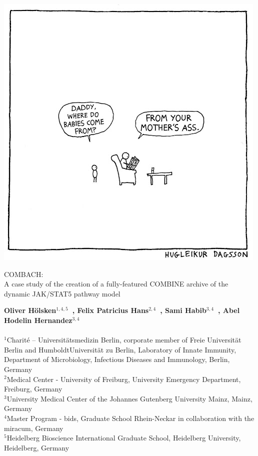 \begin{titlepage}


\begin{centering}
\includegraphics[scale=0.5]{unnamed.jpg}
\vspace{1cm}

{\noindent\huge{COMBACH:\\ A case study of the creation of a fully-featured COMBINE archive of the dynamic JAK/STAT5 pathway model}}

\end{centering}


\vspace{2cm}
\noindent\textbf{Oliver H\"olsken$^{1,4,5}$~, Felix Patricius Hans$^{2,4}$~, Sami Habib$^{3,4}$~, Abel Hodelin Hernandez$^{3,4}$~}
\\ \\
	\small $^{1}$Charité – Universit\"atsmedizin Berlin, corporate member of Freie Universit\"at Berlin and HumboldtUniversit\"at zu Berlin, Laboratory of Innate Immunity, Department of Microbiology, Infectious Diseases and Immunology, Berlin, Germany \\
	\small $^{2}$Medical Center - University of Freiburg, University Emergency Department, Freiburg, Germany \\
	\small $^{3}$University Medical Center of the Johannes Gutenberg University Mainz, Mainz, Germany \\
	\small $^{4}$Master Program - \ac{bids}, Graduate School Rhein-Neckar in collaboration with the \ac{miracum}, Germany \\
	\small $^{5}$Heidelberg Bioscience International Graduate School, Heidelberg University, Heidelberg, Germany \\
	\\



\end{titlepage}
